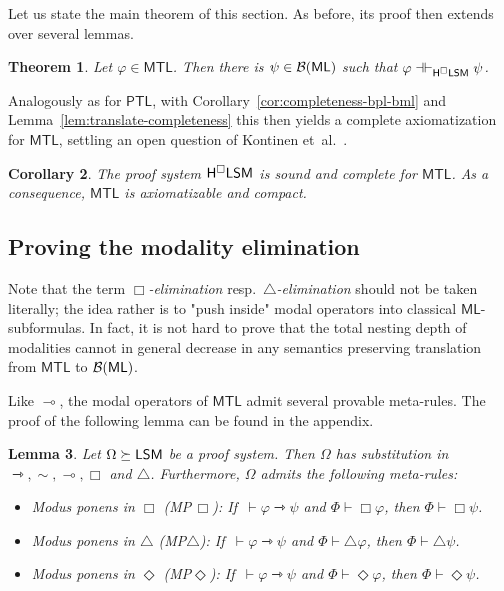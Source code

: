 \documentclass[a4paper,english,fleqn,11pt,final]{scrartcl}
\newcommand{\negg}{{\sim}}
\newcommand{\logic}[1]{\ensuremath{\mathsf{#1}}\xspace}
\newcommand{\ML}{\logic{ML}}
\newcommand{\PTL}{\logic{PTL}}
\newcommand{\MTL}{\logic{MTL}}
\newcommand{\calB}{\protect\ensuremath{\mathcal{B}}}
\newcommand{\sfS}{\protect\ensuremath{\mathsf{S}}}
\newcommand{\sfH}{\protect\ensuremath{\mathsf{H}}}
\newcommand{\sfL}{\protect\ensuremath{\mathsf{L}}}
\newcommand{\sfM}{\protect\ensuremath{\mathsf{M}}}
\newcommand{\limp}{\multimap}
\newcommand{\timp}{\rightarrowtriangle}
\newcommand{\eqpr}{\dashv\vdash}
\newcommand{\Deriv}[1]{{\normalfont\textsf{#1}}}
\theoremstyle{plain}
\newtheorem{theorem}{Theorem}[section]
\newtheorem{lemma}[theorem]{Lemma}
\newtheorem{corollary}[theorem]{Corollary}
\theoremstyle{definition}
\begin{document}
Let us state the main theorem of this section.
As before, its proof then extends over several lemmas.

\begin{theorem}\label{thm:mtl-is-equiv-to-bml}
Let $\varphi \in \MTL$.
Then there is $\psi \in \calB(\ML)$ such that $\varphi \eqpr_{\sfH^\Box\sfL\sfS\sfM} \psi$.
\end{theorem}

Analogously as for $\PTL$, with Corollary~\ref{cor:completeness-bpl-bml} and Lemma~\ref{lem:translate-completeness} this then yields a complete axiomatization for $\MTL$, settling an open question of Kontinen et~al.~\cite{kontinen_van_2014}.

\begin{corollary}\label{cor:mtl-completeness}
The proof system $\sfH^\Box\sfL\sfS\sfM$ is sound and complete for $\MTL$.
As a consequence, $\MTL$ is axiomatizable and compact.
\end{corollary}

\subsection{Proving the modality elimination}

Note that the term \emph{$\Box$-elimination} resp.\ \emph{$\triangle$-elimination} should not be taken literally; the idea rather is to "push inside" modal operators into classical $\ML$-subformulas.
In fact, it is not hard to prove that the total nesting depth of modalities cannot in general decrease in any semantics preserving translation from $\MTL$ to $\calB(\ML)$.

Like $\limp$, the modal operators of $\MTL$ admit several provable meta-rules.
The proof of the following lemma can be found in the appendix.

\begin{lemma}\label{lem:meta-mtl}
Let $\Omega\succeq \sfL\sfS\sfM$ be a proof system.
Then $\Omega$ has substitution in $\timp, \negg, \limp, \Box$ and $\triangle$.
Furthermore, $\Omega$ admits the following meta-rules:
\begin{itemize}
	\item Modus ponens in $\Box$ \Deriv{(MP\,$\Box$)}:
	If \,$\vdash \varphi \timp \psi$ and $\Phi \vdash \Box \varphi$, then $\Phi \vdash \Box \psi$.
	\item Modus ponens in $\triangle$ \Deriv{(MP$\triangle$)}:
	If \,$\vdash \varphi \timp \psi$ and $\Phi \vdash \triangle \varphi$, then $\Phi \vdash \triangle \psi$.
	\item Modus ponens in $\Diamond$ \Deriv{(MP$\Diamond$)}:
	If \,$\vdash \varphi \timp \psi$ and $\Phi \vdash \Diamond \varphi$, then $\Phi \vdash \Diamond \psi$.
\end{itemize}
\end{lemma}
\end{document}
